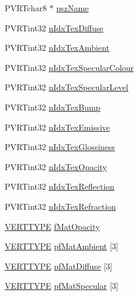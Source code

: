 \begin{DoxyCompactItemize}
\item 
P\+V\+R\+Tchar8 $\ast$ \hyperlink{struct_s_p_o_d_material_a4ab44cbfc1e19db503075d8082c90429}{psz\+Name}
\item 
P\+V\+R\+Tint32 \hyperlink{struct_s_p_o_d_material_a6d795d80328d5dc9ae7018a76d487555}{n\+Idx\+Tex\+Diffuse}
\item 
P\+V\+R\+Tint32 \hyperlink{struct_s_p_o_d_material_a10d850e51da352583f49549e12725bbe}{n\+Idx\+Tex\+Ambient}
\item 
P\+V\+R\+Tint32 \hyperlink{struct_s_p_o_d_material_acc051ad745e461cbf67d5191cf4500c8}{n\+Idx\+Tex\+Specular\+Colour}
\item 
P\+V\+R\+Tint32 \hyperlink{struct_s_p_o_d_material_a9cb44daa0051d93176e6fa77ce643bf9}{n\+Idx\+Tex\+Specular\+Level}
\item 
P\+V\+R\+Tint32 \hyperlink{struct_s_p_o_d_material_a01fcd39f070923111e8871dadfe16f40}{n\+Idx\+Tex\+Bump}
\item 
P\+V\+R\+Tint32 \hyperlink{struct_s_p_o_d_material_a9dc45a1c21a01b2ab4ff957fb060c673}{n\+Idx\+Tex\+Emissive}
\item 
P\+V\+R\+Tint32 \hyperlink{struct_s_p_o_d_material_a0fd374847d4962c3884f7a01585b760e}{n\+Idx\+Tex\+Glossiness}
\item 
P\+V\+R\+Tint32 \hyperlink{struct_s_p_o_d_material_aaf810502a450c83daf95ba5015c6726e}{n\+Idx\+Tex\+Opacity}
\item 
P\+V\+R\+Tint32 \hyperlink{struct_s_p_o_d_material_a01fde1160207ddd7e291a13aba0a6f0a}{n\+Idx\+Tex\+Reflection}
\item 
P\+V\+R\+Tint32 \hyperlink{struct_s_p_o_d_material_a692f0d8ae789579331ec8db3afd3b57b}{n\+Idx\+Tex\+Refraction}
\item 
\hyperlink{group___a_p_i___o_g_l_e_s_ga06da457b7d3e93368ab904f89e1396be}{V\+E\+R\+T\+T\+Y\+P\+E} \hyperlink{struct_s_p_o_d_material_a102d6aa05b4097f6b49fce64b6bf2c9c}{f\+Mat\+Opacity}
\item 
\hyperlink{group___a_p_i___o_g_l_e_s_ga06da457b7d3e93368ab904f89e1396be}{V\+E\+R\+T\+T\+Y\+P\+E} \hyperlink{struct_s_p_o_d_material_ad3303842dda9be3c0452bf69d925078d}{pf\+Mat\+Ambient} \mbox{[}3\mbox{]}
\item 
\hyperlink{group___a_p_i___o_g_l_e_s_ga06da457b7d3e93368ab904f89e1396be}{V\+E\+R\+T\+T\+Y\+P\+E} \hyperlink{struct_s_p_o_d_material_a635a027fd11a27fa88fbd625d2de5423}{pf\+Mat\+Diffuse} \mbox{[}3\mbox{]}
\item 
\hyperlink{group___a_p_i___o_g_l_e_s_ga06da457b7d3e93368ab904f89e1396be}{V\+E\+R\+T\+T\+Y\+P\+E} \hyperlink{struct_s_p_o_d_material_a40756a2f0cffff65f63aa8d19b5a0591}{pf\+Mat\+Specular} \mbox{[}3\mbox{]}

\end{DoxyCompactItemize}
